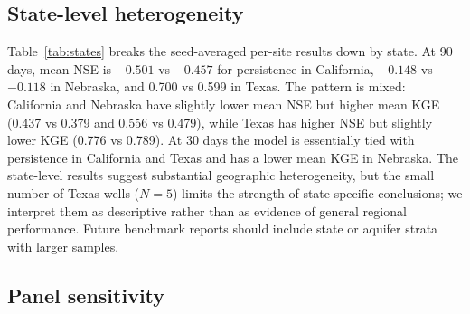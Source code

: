 \documentclass[preprint,12pt]{elsarticle}
\begin{document}
\subsection{State-level heterogeneity}

Table~\ref{tab:states} breaks the seed-averaged per-site results down by state.
At 90 days, mean NSE is $-0.501$ vs $-0.457$ for persistence in California,
$-0.148$ vs $-0.118$ in Nebraska, and 0.700 vs 0.599 in Texas. The pattern is
mixed: California and Nebraska have slightly lower mean NSE but higher mean KGE
(0.437 vs 0.379 and 0.556 vs 0.479), while Texas has higher NSE but slightly
lower KGE (0.776 vs 0.789). At 30 days the model is essentially tied with
persistence in California and Texas and has a lower mean KGE in Nebraska. The
state-level results suggest substantial geographic heterogeneity, but the
small number of Texas wells ($N=5$) limits the strength of state-specific
conclusions; we interpret them as descriptive rather than as evidence of
general regional performance. Future benchmark reports should include state or
aquifer strata with larger samples.

\begin{table}[t]
\centering
\caption{Seed-averaged per-site skill by state. Values are means across wells;
model = calibrated GRU, pers = persistence. $N$ is the number of wells at 30/90
days. The Texas sample has only five wells; state-level differences are
descriptive and should not be generalized.}
\label{tab:states}
\end{table}

\subsection{Panel sensitivity}
\end{document}
